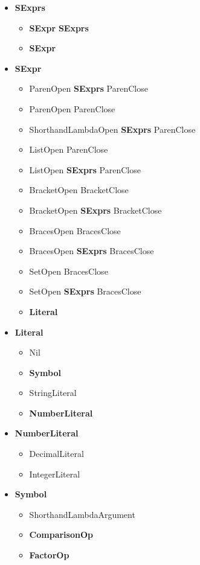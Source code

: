 \documentclass[11pt]{scrreprt}
\begin{document}
\begin{itemize}
  \item \textbf{SExprs}
  \begin{itemize}
    \item \textbf{SExpr} \textbf{SExprs}
    \item \textbf{SExpr}
  \end{itemize}
  \item \textbf{SExpr}
  \begin{itemize}
    \item ParenOpen \textbf{SExprs} ParenClose
    \item ParenOpen ParenClose
    \item ShorthandLambdaOpen \textbf{SExprs} ParenClose
    \item ListOpen ParenClose
    \item ListOpen \textbf{SExprs} ParenClose
    \item BracketOpen BracketClose
    \item BracketOpen \textbf{SExprs} BracketClose
    \item BracesOpen BracesClose
    \item BracesOpen \textbf{SExprs} BracesClose
    \item SetOpen BracesClose
    \item SetOpen \textbf{SExprs} BracesClose
    \item \textbf{Literal}
  \end{itemize}
  \item \textbf{Literal}
  \begin{itemize}
    \item Nil
    \item \textbf{Symbol}
    \item StringLiteral
    \item \textbf{NumberLiteral}
  \end{itemize}
  \item \textbf{NumberLiteral}
  \begin{itemize}
    \item DecimalLiteral
    \item IntegerLiteral
  \end{itemize}
  \item \textbf{Symbol}
  \begin{itemize}
    \item ShorthandLambdaArgument
    \item \textbf{ComparisonOp}
    \item \textbf{FactorOp}

\end{itemize}
\end{itemize}
\end{document}
